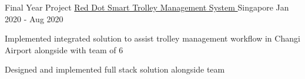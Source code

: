 
\begin{cventries}


  \cventry
    {Final Year Project} %
    {\href{https://capstone2020.sutd.edu.sg/projects/smart-trolley-management-system} {Red Dot Smart Trolley Management System \faLink} } %
    {Singapore} %
    {Jan 2020 - Aug 2020} %
    {
      \begin{cvitems} %
      	\item {Implemented integrated solution to assist trolley management workflow in Changi Airport alongside with team of 6}
      	\item {Designed and implemented full stack solution alongside team}
      \end{cvitems}
    }
    

    


\end{cventries}
